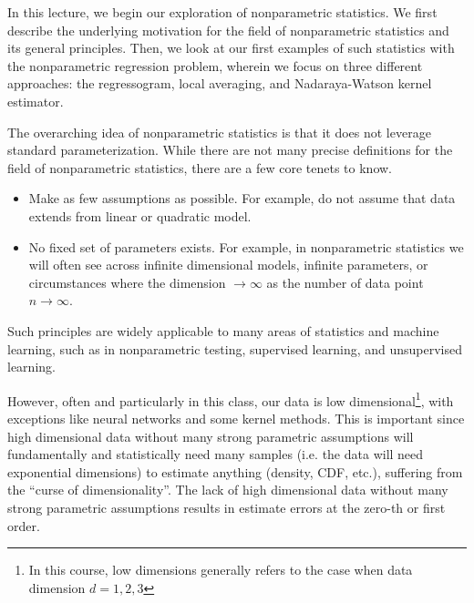 \setcounter{section}{0}



In this lecture, we begin our exploration of nonparametric statistics. We first describe the underlying motivation for the field of nonparametric statistics and its general principles. Then, we look at our first examples of such statistics with the nonparametric regression problem, wherein we focus on three different approaches: the regressogram, local averaging, and Nadaraya-Watson kernel estimator.



The overarching idea of nonparametric statistics is that it does not leverage standard parameterization. While there are not many precise definitions for the field of nonparametric statistics, there are a few core tenets to know.
\begin{itemize}
	\item Make as few assumptions as possible. For example, do not assume that data extends from linear or quadratic model. 
	\item No fixed set of parameters exists. For example, in nonparametric statistics we will often see across infinite dimensional models, infinite parameters, or circumstances where the dimension $\rightarrow \infty$ as the number of data point $n \rightarrow \infty$.
\end{itemize}
Such principles are widely applicable to many areas of statistics and machine learning, such as in nonparametric testing, supervised learning, and unsupervised learning. 

However, often and particularly in this class, our data is low dimensional\footnote{In this course, low dimensions generally refers to the case when data dimension $d = 1, 2, 3$}, with exceptions like neural networks and some kernel methods. This is important since high dimensional data without many strong parametric assumptions will fundamentally and statistically need many samples (i.e. the data will need exponential dimensions) to estimate anything (density, CDF, etc.), suffering from the ``curse of dimensionality''. The lack of high dimensional data without many strong parametric assumptions results in estimate errors at the zero-th or first order. 

